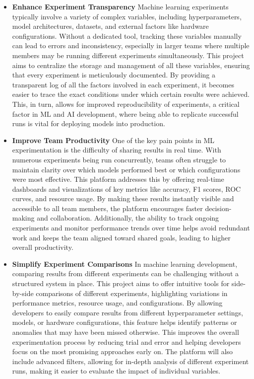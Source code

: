 \documentclass[12pt]{article}
\begin{document}
\begin{itemize}
\item \textbf{Enhance Experiment Transparency}
Machine learning experiments typically involve a variety of complex variables, including hyperparameters, model architectures, datasets, and external factors like hardware configurations. Without a dedicated tool, tracking these variables manually can lead to errors and inconsistency, especially in larger teams where multiple members may be running different experiments simultaneously. This project aims to centralize the storage and management of all these variables, ensuring that every experiment is meticulously documented. By providing a transparent log of all the factors involved in each experiment, it becomes easier to trace the exact conditions under which certain results were achieved. This, in turn, allows for improved reproducibility of experiments, a critical factor in ML and AI development, where being able to replicate successful runs is vital for deploying models into production.

\item \textbf{Improve Team Productivity}
One of the key pain points in ML experimentation is the difficulty of sharing results in real time. With numerous experiments being run concurrently, teams often struggle to maintain clarity over which models performed best or which configurations were most effective. This platform addresses this by offering real-time dashboards and visualizations of key metrics like accuracy, F1 scores, ROC curves, and resource usage. By making these results instantly visible and accessible to all team members, the platform encourages faster decision-making and collaboration. Additionally, the ability to track ongoing experiments and monitor performance trends over time helps avoid redundant work and keeps the team aligned toward shared goals, leading to higher overall productivity.

\item \textbf{Simplify Experiment Comparisons}
In machine learning development, comparing results from different experiments can be challenging without a structured system in place. This project aims to offer intuitive tools for side-by-side comparisons of different experiments, highlighting variations in performance metrics, resource usage, and configurations. By allowing developers to easily compare results from different hyperparameter settings, models, or hardware configurations, this feature helps identify patterns or anomalies that may have been missed otherwise. This improves the overall experimentation process by reducing trial and error and helping developers focus on the most promising approaches early on. The platform will also include advanced filters, allowing for in-depth analysis of different experiment runs, making it easier to evaluate the impact of individual variables.


\end{itemize}
\end{document}
